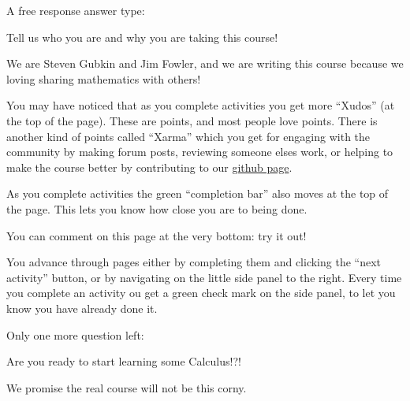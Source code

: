 \documentclass{ximera}
\begin{document}
A free response answer type:

Tell us who you are and why you are taking this course!
\begin{free-response}
	We are Steven Gubkin and Jim Fowler, and we are writing this course because we loving sharing mathematics with others!
\end{free-response}

You may have noticed that as you complete activities you get more ``Xudos'' (at the top of the page).  These are points, and most people love points.
There is another kind of points called ``Xarma'' which you get for engaging with the community by making forum posts, reviewing someone elses work, or 
helping to make the course better by contributing to our \href{https://github.com/kisonecat/m2o2c2}{github page}.

As you complete activities the green ``completion bar''  also moves at the top of the page.  This lets you know how close you are to being done.

You can comment on this page at the very bottom:  try it out!

You advance through pages either by completing them and clicking the ``next activity'' button, or by navigating on the little side panel to the right. 
 Every time you complete an activity ou get a green check mark on the side panel, to let you know you have already done it.
 
Only one more question left:
\begin{question}
	\begin{solution}
		Are you ready to start learning some Calculus!?!
		\begin{multiple-choice}
			\begin{hint}
				We promise the real course will not be this corny.
			\end{hint}
		\end{multiple-choice}
	\end{solution}
\end{question}
\end{document}
